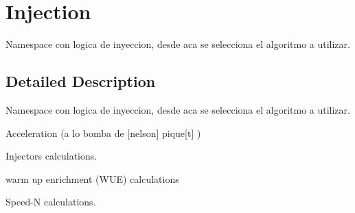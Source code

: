 \hypertarget{group__Injection}{}\section{Injection}
\label{group__Injection}


Namespace con logica de inyeccion, desde aca se selecciona el algoritmo a utilizar.  




\subsection{Detailed Description}
Namespace con logica de inyeccion, desde aca se selecciona el algoritmo a utilizar. 

Acceleration (a lo bomba de \mbox{[}nelson\mbox{]} pique\mbox{[}t\mbox{]} )

Injectors calculations.

warm up enrichment (W\+UE) calculations

Speed-\/N calculations.